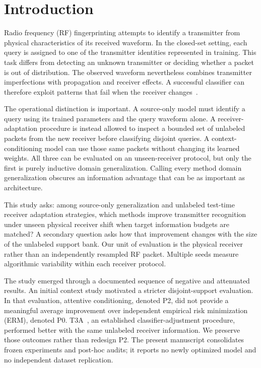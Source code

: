 \section{Introduction}
Radio frequency (RF) fingerprinting attempts to identify a transmitter from physical characteristics of its received waveform. In the closed-set setting, each query is assigned to one of the transmitter identities represented in training. This task differs from detecting an unknown transmitter or deciding whether a packet is out of distribution. The observed waveform nevertheless combines transmitter imperfections with propagation and receiver effects. A successful classifier can therefore exploit patterns that fail when the receiver changes~\cite{wisig,shen}.

The operational distinction is important. A source-only model must identify a query using its trained parameters and the query waveform alone. A receiver-adaptation procedure is instead allowed to inspect a bounded set of unlabeled packets from the new receiver before classifying disjoint queries. A context-conditioning model can use those same packets without changing its learned weights. All three can be evaluated on an unseen-receiver protocol, but only the first is purely inductive domain generalization. Calling every method domain generalization obscures an information advantage that can be as important as architecture.

This study asks: among source-only generalization and unlabeled test-time receiver adaptation strategies, which methods improve transmitter recognition under unseen physical receiver shift when target information budgets are matched? A secondary question asks how that improvement changes with the size of the unlabeled support bank. Our unit of evaluation is the physical receiver rather than an independently resampled RF packet. Multiple seeds measure algorithmic variability within each receiver protocol.

The study emerged through a documented sequence of negative and attenuated results. An initial context study motivated a stricter disjoint-support evaluation. In that evaluation, attentive conditioning, denoted P2, did not provide a meaningful average improvement over independent empirical risk minimization (ERM), denoted P0. T3A~\cite{t3a}, an established classifier-adjustment procedure, performed better with the same unlabeled receiver information. We preserve those outcomes rather than redesign P2. The present manuscript consolidates frozen experiments and post-hoc audits; it reports no newly optimized model and no independent dataset replication.

